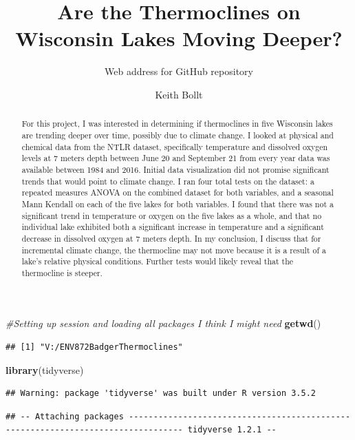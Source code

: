 \documentclass[12pt,]{article}
\title{Are the Thermoclines on Wisconsin Lakes Moving Deeper?}
\subtitle{Web address for GitHub repository}
\author{Keith Bollt}
\date{}
\newenvironment{Shaded}{\begin{snugshade}}{\end{snugshade}}
\newcommand{\KeywordTok}[1]{\textcolor[rgb]{0.13,0.29,0.53}{\textbf{#1}}}
\newcommand{\CommentTok}[1]{\textcolor[rgb]{0.56,0.35,0.01}{\textit{#1}}}
\newcommand{\NormalTok}[1]{#1}
\begin{document}
\maketitle
\begin{abstract}
For this project, I was interested in determining if thermoclines in
five Wisconsin lakes are trending deeper over time, possibly due to
climate change. I looked at physical and chemical data from the NTLR
dataset, specifically temperature and dissolved oxygen levels at 7
meters depth between June 20 and September 21 from every year data was
available between 1984 and 2016. Initial data visualization did not
promise significant trends that would point to climate change. I ran
four total tests on the dataset: a repeated measures ANOVA on the
combined dataset for both variables, and a seasonal Mann Kendall on each
of the five lakes for both variables. I found that there was not a
significant trend in temperature or oxygen on the five lakes as a whole,
and that no individual lake exhibited both a significant increase in
temperature and a significant decrease in dissolved oxygen at 7 meters
depth. In my conclusion, I discuss that for incremental climate change,
the thermocline may not move because it is a result of a lake's relative
physical conditions. Further tests would likely reveal that the
thermocline is steeper.
\end{abstract}

\begin{Shaded}
\begin{Highlighting}[]
\CommentTok{#Setting up session and loading all packages I think I might need}
\KeywordTok{getwd}\NormalTok{()}
\end{Highlighting}
\end{Shaded}

\begin{verbatim}
## [1] "V:/ENV872BadgerThermoclines"
\end{verbatim}

\begin{Shaded}
\begin{Highlighting}[]
\KeywordTok{library}\NormalTok{(tidyverse)}
\end{Highlighting}
\end{Shaded}

\begin{verbatim}
## Warning: package 'tidyverse' was built under R version 3.5.2
\end{verbatim}

\begin{verbatim}
## -- Attaching packages --------------------------------------------------------------------------------- tidyverse 1.2.1 --
\end{verbatim}
\end{document}
